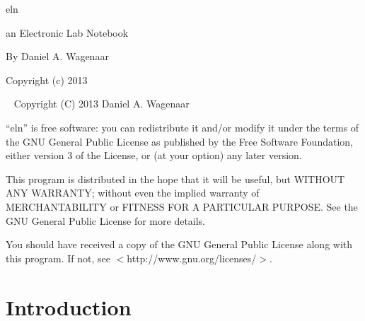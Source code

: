 \documentclass[11pt]{report}
\begin{document}
\thispagestyle{empty}
\begin{centering}
  {\Huge eln}
  \vskip30pt

  {\Large an Electronic Lab Notebook}
  \vskip60pt

  {\large By Daniel A. Wagenaar}
  \vfill
  
  {Copyright (c) 2013}
  
\end{centering}
\pagebreak
~
\vfill
\noindent Copyright (C) 2013 Daniel A. Wagenaar\medskip

``eln'' is free software: you can redistribute it and/or modify
it under the terms of the GNU General Public License as published by
the Free Software Foundation, either version 3 of the License, or
(at your option) any later version.

This program is distributed in the hope that it will be useful,
but WITHOUT ANY WARRANTY; without even the implied warranty of
MERCHANTABILITY or FITNESS FOR A PARTICULAR PURPOSE.  See the
GNU General Public License for more details.

You should have received a copy of the GNU General Public License
along with this program.  If not, see $<$http://www.gnu.org/licenses/$>$.
\pagebreak

\chapter{Introduction}
\end{document}
